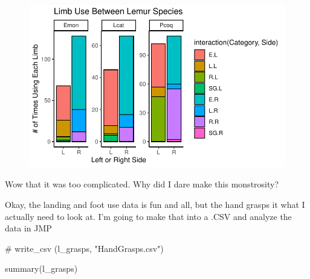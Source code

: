 \documentclass[
  letterpaper,
  DIV=11,
  numbers=noendperiod]{scrartcl}
\newenvironment{Shaded}{\begin{snugshade}}{\end{snugshade}}
\newcommand{\CommentTok}[1]{\textcolor[rgb]{0.37,0.37,0.37}{#1}}
\newcommand{\FunctionTok}[1]{\textcolor[rgb]{0.28,0.35,0.67}{#1}}
\newcommand{\NormalTok}[1]{\textcolor[rgb]{0.00,0.23,0.31}{#1}}
\begin{document}
\begin{figure}[H]

{\centering \includegraphics{LeftyLemurs_files/figure-pdf/unnamed-chunk-47-1.pdf}

}

\end{figure}

Wow that it was too complicated. Why did I dare make this monstrosity?

Okay, the landing and foot use data is fun and all, but the hand grasps
it what I actually need to look at. I'm going to make that into a .CSV
and analyze the data in JMP

\begin{Shaded}
\begin{Highlighting}[]
\CommentTok{\# write\_csv (l\_grasps, "HandGrasps.csv")}

\FunctionTok{summary}\NormalTok{(l\_grasps)}
\end{Highlighting}
\end{Shaded}
\end{document}
